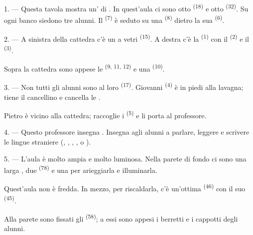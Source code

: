 \VUsaut{1.4mm}
\VUsaut{2.2mm}
\VUfilet{20mm}
\VUsaut{6.4mm}

\VUsaut{3.0mm}

1. --- Questa tavola mostra un' di . In quest'aula ci sono
otto  \textsuperscript{(18)} e otto 
\textsuperscript{(32)}. Su ogni banco siedono tre alunni. Il 
\textsuperscript{(7)} è seduto su una  \textsuperscript{(8)} dietro la
sua  \textsuperscript{(6)}.

2. --- A sinistra della cattedra c'è un  a vetri
\textsuperscript{(15)}. A destra c'è la  \textsuperscript{(1)} con il
 \textsuperscript{(2)} e il  \textsuperscript{(3)}.

Sopra la cattedra sono appese le  \textsuperscript{(9, 11, 12)}
e una  \textsuperscript{(10)}.

3. --- Non tutti gli alunni sono al loro  \textsuperscript{(17)}.
Giovanni \textsuperscript{(4)} è in piedi alla lavagna; tiene il cancellino e
cancella le .

Pietro è vicino alla cattedra; raccoglie i 
\textsuperscript{(5)} e li porta al professore.

4. --- Questo professore insegna . Insegna agli alunni a
parlare, leggere e scrivere le lingue straniere (, ,
, ,  o ).

5. --- L'aula è molto ampia e molto luminosa. Nella parete di fondo ci sono una larga
, due  \textsuperscript{(78)} e una
 per arieggiarla e illuminarla.

Quest'aula non è fredda. In mezzo, per riscaldarla, c'è un'ottima 
\textsuperscript{(46)} con il suo  \textsuperscript{(45)}.

Alla parete sono fissati gli  \textsuperscript{(58)}; a essi sono
appesi i berretti e i cappotti degli alunni.

